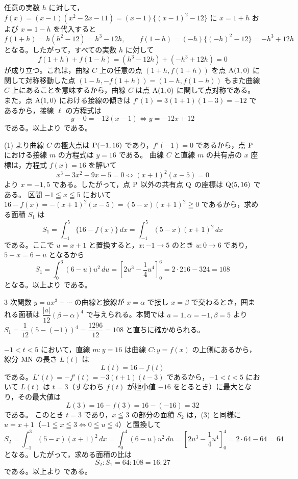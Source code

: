
任意の実数 $h$ に対して，$f(x)=(x-1)(x^{2}-2x-11)=(x-1)\{(x-1)^{2}-12\}$ に $x=1+h$ および $x=1-h$ を代入すると
\[
  f(1+h)=h(h^{2}-12)=h^{3}-12h,\qquad
  f(1-h)=(-h)\{(-h)^{2}-12\}=-h^{3}+12h
\]
となる。したがって，すべての実数 $h$ に対して
\[
  f(1+h)+f(1-h)=(h^{3}-12h)+(-h^{3}+12h)=0
\]
が成り立つ。これは，曲線 $C$ 上の任意の点 $(1+h, f(1+h))$ を点 $\mathrm{A}(1, 0)$ に関して対称移動した点 $(1-h, -f(1+h))=(1-h, f(1-h))$ もまた曲線 $C$ 上にあることを意味するから，曲線 $C$ は点 $\mathrm{A}(1, 0)$ に関して点対称である。
また，点 $\mathrm{A}(1, 0)$ における接線の傾きは $f'(1)=3(1+1)(1-3)=-12$ であるから，接線 $\ell$ の方程式は
\[
  y-0=-12(x-1) \iff y=-12x+12
\]
である。以上より
である。

(1) より曲線 $C$ の極大点は $\mathrm{P}(-1, 16)$ であり，$f'(-1)=0$ であるから，点 $\mathrm{P}$ における接線 $m$ の方程式は $y=16$ である。
曲線 $C$ と直線 $m$ の共有点の $x$ 座標は，方程式 $f(x)=16$ を解いて
\[
  x^{3}-3x^{2}-9x-5=0 \iff (x+1)^{2}(x-5)=0
\]
より $x=-1, 5$ である。したがって，点 $\mathrm{P}$ 以外の共有点 $\mathrm{Q}$ の座標は $\mathrm{Q}(5, 16)$ である。
区間 $-1\leqq x\leqq 5$ において $16-f(x)=-(x+1)^{2}(x-5)=(5-x)(x+1)^{2}\geqq 0$ であるから，求める面積 $S_{1}$ は
\[
  S_{1}=\int_{-1}^{5}\{16-f(x)\}\,dx=\int_{-1}^{5}(5-x)(x+1)^{2}\,dx
\]
である。ここで $u=x+1$ と置換すると，$x:-1\to 5$ のとき $u:0\to 6$ であり，$5-x=6-u$ となるから
\[
  S_{1}=\int_{0}^{6}(6-u)u^{2}\,du=\left[2u^{3}-\frac{1}{4}u^{4}\right]_{0}^{6}=2\cdot 216-324=108
\]
となる。以上より
である。

\begin{betsu}
$3$ 次関数 $y=ax^{3}+\cdots$ の曲線と接線が $x=\alpha$ で接し $x=\beta$ で交わるとき，囲まれる面積は $\dfrac{|a|}{12}(\beta-\alpha)^{4}$ で与えられる。本問では $a=1, \alpha=-1, \beta=5$ より $S_{1}=\dfrac{1}{12}(5-(-1))^{4}=\dfrac{1296}{12}=108$ と直ちに確かめられる。
\end{betsu}

$-1<t<5$ において，直線 $m:y=16$ は曲線 $C:y=f(x)$ の上側にあるから，線分 $\mathrm{MN}$ の長さ $L(t)$ は
\[
  L(t)=16-f(t)
\]
である。$L'(t)=-f'(t)=-3(t+1)(t-3)$ であるから，$-1<t<5$ において $L(t)$ は $t=3$（すなわち $f(t)$ が極小値 $-16$ をとるとき）に最大となり，その最大値は
\[
  L(3)=16-f(3)=16-(-16)=32
\]
である。
このとき $t=3$ であり，$x\leqq 3$ の部分の面積 $S_{2}$ は，(3) と同様に $u=x+1$（$-1\leqq x\leqq 3 \iff 0\leqq u\leqq 4$）と置換して
\[
  S_{2}=\int_{-1}^{3}(5-x)(x+1)^{2}\,dx=\int_{0}^{4}(6-u)u^{2}\,du=\left[2u^{3}-\frac{1}{4}u^{4}\right]_{0}^{4}=2\cdot 64-64=64
\]
となる。したがって，求める面積の比は
\[
  S_{2}:S_{1}=64:108=16:27
\]
である。以上より
である。

